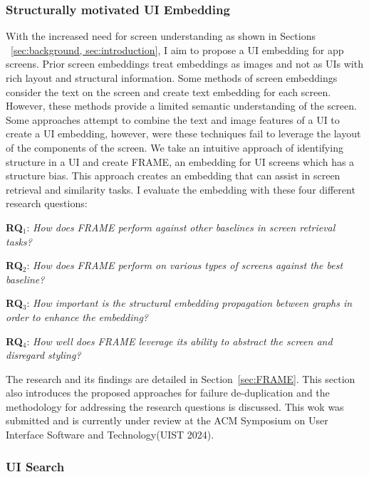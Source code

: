 \subsubsection{Structurally motivated UI Embedding}
With the increased need for  screen understanding as shown in Sections ~\ref{sec:background, sec:introduction}, I aim to propose a UI embedding for app screens. Prior screen embeddings treat embeddings as images and not as UIs with rich layout and structural information. Some methods of screen embeddings consider the text on the screen and create text embedding for each screen. However, these methods provide a limited semantic understanding of the screen. Some approaches attempt to combine the text and image features of a UI to create a UI embedding, however, were these techniques fail to leverage the layout of the components of the screen. We take an intuitive approach of identifying structure in a UI and create FRAME, an embedding for UI screens which has a structure bias. This approach creates an embedding that can assist in screen retrieval and similarity tasks. I evaluate the embedding with these four different research questions: 

\begin{description}
  
    \item \textbf{RQ$_1$}: \textit{How does FRAME perform against other baselines in screen retrieval tasks?}
    \item \textbf{RQ$_2$}: \textit{How does FRAME perform on various types of screens against the best baseline?}
    \item \textbf{RQ$_3$}: \textit{How important is the structural embedding propagation between graphs in order to enhance the embedding?}
    \item \textbf{RQ$_4$}: \textit{How well does FRAME leverage its ability to abstract the screen and disregard styling?}

 \end{description}


The research and its findings are detailed in Section~\ref{sec:FRAME}. This section also introduces the proposed approaches for failure de-duplication and the methodology for addressing the research questions is discussed. This wok was submitted and is currently under review at the ACM Symposium on User Interface Software and Technology(UIST 2024). 


\subsubsection{UI Search}


